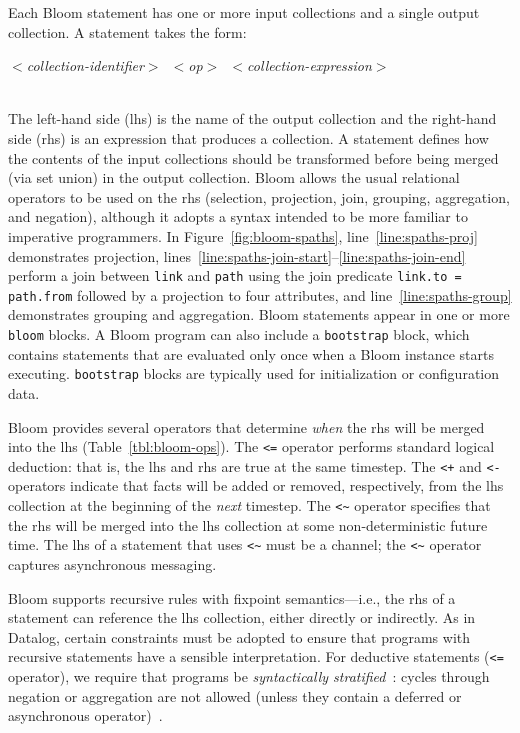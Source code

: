 Each Bloom statement has one or more input collections and a single output
collection.  A statement takes the form: \\ 
\centerline{
\mbox{\hspace{0.25in}\emph{$<$collection-identifier$>$ $<$op$>$
    $<$collection-expression$>$}}}\\ \noindent
The left-hand side (lhs) is the name of the output collection and the right-hand
side (rhs) is an expression that produces a collection.  A statement defines how
the contents of the input collections should be transformed before being
merged (via set union) in the output collection. Bloom allows the usual
relational operators to be used on the rhs (selection, projection, join,
grouping, aggregation, and negation), although it adopts a syntax intended to be
more familiar to imperative programmers. In Figure~\ref{fig:bloom-spaths},
line~\ref{line:spaths-proj} demonstrates projection,
lines~\ref{line:spaths-join-start}--\ref{line:spaths-join-end} perform a join
between \texttt{link} and \texttt{path} using the join predicate
\verb+link.to = path.from+ followed by a projection to four attributes, and
line~\ref{line:spaths-group} demonstrates grouping and aggregation. Bloom
statements appear in one or more \texttt{bloom} blocks. A Bloom program can also
include a \texttt{bootstrap} block, which contains statements that are evaluated
only once when a Bloom instance starts executing. \texttt{bootstrap} blocks are
typically used for initialization or configuration data.

Bloom provides several operators that determine \emph{when} the rhs will be
merged into the lhs (Table~\ref{tbl:bloom-ops}). The \verb|<=| operator performs
standard logical deduction: that is, the lhs and rhs are true at the same
timestep. The \verb|<+| and \verb|<-| operators indicate that facts will be
added or removed, respectively, from the lhs collection at the beginning of the
\emph{next} timestep. The \verb+<~+ operator specifies that the rhs will be merged into
the lhs collection at some non-deterministic future time. The lhs of a statement
that uses \verb+<~+ must be a channel; the \verb+<~+ operator captures
asynchronous messaging.

Bloom supports recursive rules with fixpoint semantics---i.e., the rhs of a statement can reference the lhs
collection, either directly or indirectly. As in Datalog, certain constraints
must be adopted to ensure that programs with recursive statements have a
sensible interpretation. For deductive statements (\verb+<=+ operator), we
require that programs be \emph{syntactically stratified}~\cite{Apt1988}: cycles
through negation or aggregation are not allowed (unless they contain a deferred
or asynchronous operator)~\cite{dedalus}.


